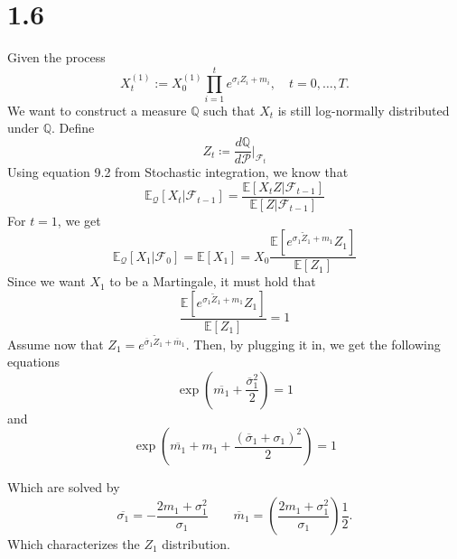 \documentclass{article}
\begin{document}
\section{1.6}
Given the process
\begin{equation}
  X_t^{(1)} := X_0^{(1)} \prod_{i=1}^{t} e^{\sigma_i Z_i + m_i}, \quad t = 0, \dots, T.
\end{equation}
We want to construct a measure \(\mathbb{Q}\) such that \(X_t\) is still log-normally distributed under \(\mathbb{Q}\).
Define
\begin{equation}
  Z_t \coloneqq \frac{d\mathbb{Q}}{d\mathcal{P}}\bigg|_{\mathcal{F}_t}
\end{equation}
Using equation 9.2 from Stochastic integration, we know that
\begin{equation}
  \mathbb{E}_\mathcal{Q} \left[ X_t|\mathcal{F}_{t-1}  \right] = \frac{\mathbb{E} \left[ X_t Z | \mathcal{F}_{t-1}  \right]}{\mathbb{E} \left[ Z|\mathcal{F}_{t-1}  \right]}
\end{equation}
For \(t=1\), we get
\begin{equation}
  \mathbb{E}_\mathcal{Q} \left[ X_1|\mathcal{F}_{0}  \right] = \mathbb{E} \left[ X_1 \right] = X_0 \frac{\mathbb{E} \left[ e^{\sigma _1 \widetilde{Z} _1+m_1} Z_1  \right]}{\mathbb{E} \left[ Z_1 \right]}
\end{equation}
Since we want \(X_1\) to be a Martingale, it must hold that
\begin{equation}
  \frac{\mathbb{E} \left[ e^{\sigma _1 \widetilde{Z} _1+m_1} Z_1  \right]}{\mathbb{E} \left[ Z_1 \right]} = 1
\end{equation}
Assume now that \(Z_1 = e^{\overline{\sigma }_1 \widetilde{Z}_1 + \overline{m}_1  }\).
Then, by plugging it in, we get the following equations
\begin{equation}
  \exp \left( {\overline{m_1} + \frac{\overline{\sigma}_1^2}{2}  }  \right)= 1
\end{equation}
and
\begin{equation}
  \exp\left( {\overline{m_1} +m_1 + \frac{(\overline{\sigma}_1 + \sigma _1)^2}{2}  } \right) = 1
\end{equation}

Which are solved by
\begin{equation}
  \overline{\sigma _1} = -\frac{2m_1 +\sigma _1^2}{\sigma _1} \quad\quad \overline{m} _1 =\left(  \frac{2m_{1}+\sigma _1^2 }{ \sigma _1}  \right) \frac{1}{2}.
\end{equation}
Which characterizes the \(Z_1\) distribution.
\end{document}
